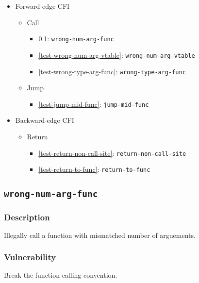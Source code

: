 \documentclass[a4paper]{book}
\begin{document}
\begin{itemize}[noitemsep]
\item Forward-edge CFI
  \begin{itemize}[noitemsep, nolistsep, leftmargin=1em]
  \item Call
    \begin{itemize}[noitemsep, nolistsep, leftmargin=1em]
    \item \ref{test-wrong-num-arg-func}: \texttt{wrong-num-arg-func}
    \item \ref{test-wrong-num-arg-vtable}: \texttt{wrong-num-arg-vtable}
    \item \ref{test-wrong-type-arg-func}: \texttt{wrong-type-arg-func}
    \end{itemize}
  \item Jump
    \begin{itemize}[noitemsep, nolistsep, leftmargin=1em]
    \item \ref{test-jump-mid-func}: \texttt{jump-mid-func}
    \end{itemize}
  \end{itemize}
\item Backward-edge CFI
  \begin{itemize}[noitemsep, nolistsep, leftmargin=1em]
  \item Return
    \begin{itemize}[noitemsep, nolistsep, leftmargin=1em]
    \item \ref{test-return-non-call-site}: \texttt{return-non-call-site}
    \item \ref{test-return-to-func}: \texttt{return-to-func}  
    \end{itemize}
  \end{itemize}
\end{itemize}

\newpage
\subsection{\texttt{wrong-num-arg-func}}\label{test-wrong-num-arg-func}

\subsubsection{Description}
Illegally call a function with mismatched number of arguements.

\subsubsection{Vulnerability}
Break the function calling convention.
\end{document}
